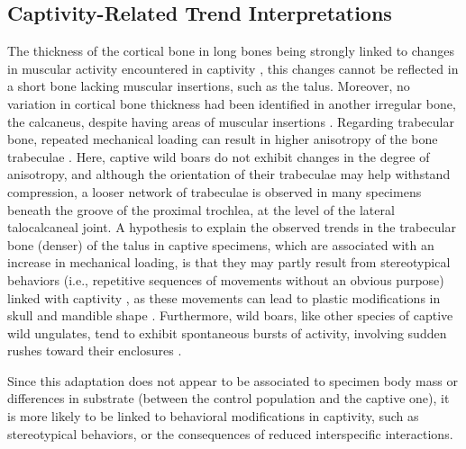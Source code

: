 \documentclass[12pt,a4paper]{article}
\begin{document}
\subsection{Captivity-Related Trend Interpretations}
The thickness of the cortical bone in long bones being strongly linked to changes in muscular activity encountered in captivity \cite{harbersInvestigatingImpactCaptivity2020ab, pelletierInfluenceCaptivitySelection2021d}, this changes cannot be reflected in a short bone lacking muscular insertions, such as the talus. Moreover, no variation in cortical bone thickness had been identified in another irregular bone, the calcaneus, despite having areas of muscular insertions \cite{cottereauCanGrowthCaptivity2023ab}.
Regarding trabecular bone, repeated mechanical loading can result in higher anisotropy of the bone trabeculae \cite{georgiouTrabecularBonePatterning2018}. Here, captive wild boars do not exhibit changes in the degree of anisotropy, and although the orientation of their trabeculae may help withstand compression, a looser network of trabeculae is observed in many specimens beneath the groove of the proximal trochlea, at the level of the lateral talocalcaneal joint.  
A hypothesis to explain the observed trends in the trabecular bone (denser) of the talus in captive specimens, which are associated with an increase in mechanical loading, is that they may partly result from stereotypical behaviors (i.e., repetitive sequences of movements without an obvious purpose) linked with captivity \cite{broomAssessingWelfareSuffering1991, neauxHowChangesFunctional2021t}, as these movements can lead to plastic modifications in skull and mandible shape \cite{neauxHowChangesFunctional2021t}. Furthermore, wild boars, like other species of captive wild ungulates, tend to exhibit spontaneous bursts of activity, involving sudden rushes toward their enclosures \cite{mayerWildPigsBiology2009}.

Since this adaptation does not appear to be associated to specimen body mass or differences in substrate (between the control population and the captive one), it is more likely to be linked to behavioral modifications in captivity, such as stereotypical behaviors, or the consequences of reduced interspecific interactions.

\end{document}
